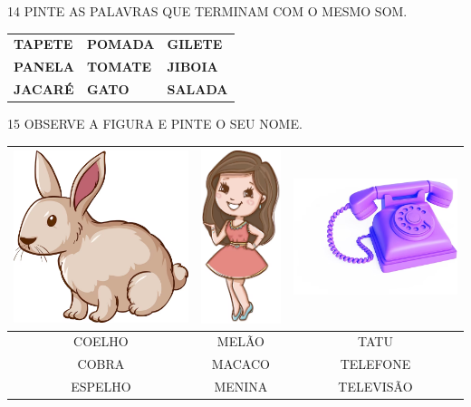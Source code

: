 \num{14} PINTE AS PALAVRAS QUE TERMINAM COM O MESMO SOM.

\begin{longtable}[]{@{}lll@{}}
\toprule
\textbf{TAPETE} & \textbf{POMADA} & \textbf{GILETE}\tabularnewline
\textbf{PANELA} & \textbf{TOMATE} & \textbf{JIBOIA}\tabularnewline
\textbf{JACARÉ} & \textbf{GATO} & \textbf{SALADA}\tabularnewline
\bottomrule
\end{longtable}

\num{15} OBSERVE A FIGURA E PINTE O SEU NOME.

\begin{center}
\begin{tabular}{ccc}
\multicolumn{1}{l}{\includegraphics[width=.2\textwidth]{media/image70.png}} & \multicolumn{1}{l}{\includegraphics[width=.2\textwidth]{media/image72.png} } & \multicolumn{1}{l}{\includegraphics[width=.2\textwidth]{media/image73.png}} \\ \hline
\multicolumn{1}{|c|}{COELHO} & \multicolumn{1}{c|}{MELÃO} & \multicolumn{1}{c|}{TATU} \\ \hline
\multicolumn{1}{|c|}{COBRA} & \multicolumn{1}{c|}{MACACO} & \multicolumn{1}{c|}{TELEFONE} \\ \hline
\multicolumn{1}{|c|}{ESPELHO} & \multicolumn{1}{c|}{MENINA} & \multicolumn{1}{c|}{TELEVISÃO} \\ \hline
\end{tabular}
\end{center}

